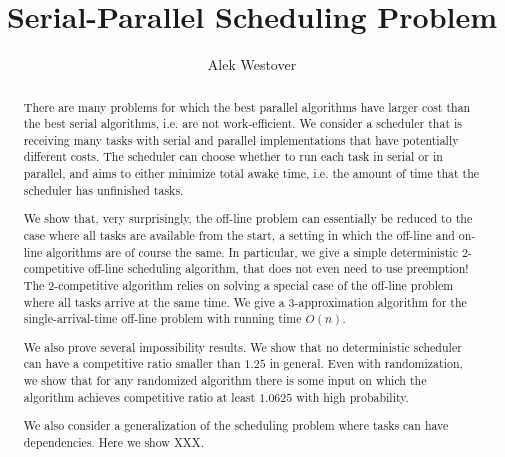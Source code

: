 \documentclass[twocolumn]{article}[10pt]
\author{Alek Westover}
\title{Serial-Parallel Scheduling Problem}
\begin{document}
\maketitle

\begin{abstract}
There are many problems for which the best parallel algorithms
have larger cost than the best serial algorithms, i.e. are not
work-efficient. We consider a scheduler that is receiving many
tasks with serial and parallel implementations that have
potentially different costs. The scheduler can choose whether to
run each task in serial or in parallel, and aims to either
minimize total awake time, i.e. the amount of time that the
scheduler has unfinished tasks. 

We show that, very surprisingly, the off-line problem can
essentially be reduced to the case where all tasks are available
from the start, a setting in which the off-line and on-line
algorithms are of course the same. In particular, we give a
simple deterministic $2$-competitive off-line scheduling
algorithm, that does not even need to use preemption! The
$2$-competitive algorithm relies on solving a special case of the
off-line problem where all tasks arrive at the same time. We give
a $3$-approximation algorithm for the single-arrival-time
off-line problem with running time $O(n)$.

We also prove several impossibility results.
We show that no deterministic scheduler can have a
competitive ratio smaller than $1.25$ in general.
Even with randomization, we show that for any randomized
algorithm there is some input on which the algorithm achieves
competitive ratio at least $1.0625$ with high probability.

We also consider a generalization of the scheduling problem where
tasks can have dependencies. Here we show XXX.
\end{abstract}








\end{document}
